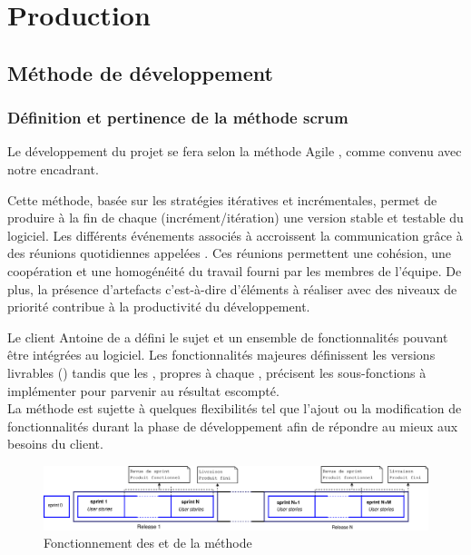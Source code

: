 \chapter{Production}
\section{Méthode de développement}
\subsection{Définition et pertinence de la méthode scrum}
Le développement du projet se fera selon la méthode Agile , comme convenu avec notre encadrant.

Cette méthode, basée sur les stratégies itératives et incrémentales, permet de produire à la fin de chaque  (incrément/itération) une version stable et testable du logiciel. Les différents événements associés à  accroissent la communication grâce à des réunions quotidiennes appelées . Ces réunions permettent une cohésion, une coopération et une homogénéité du travail fourni par les membres de l'équipe. De plus, la présence d'artefacts c'est-à-dire d'éléments à réaliser avec des niveaux de priorité contribue à la productivité du développement.
 
Le client Antoine de  a défini le sujet et un ensemble de fonctionnalités pouvant être intégrées au logiciel. Les fonctionnalités majeures définissent les versions livrables () tandis que les , propres à chaque , précisent les sous-fonctions à implémenter pour parvenir au résultat escompté. \\
La méthode  est sujette à quelques flexibilités tel que l'ajout ou la modification de fonctionnalités durant la phase de développement afin de répondre au mieux aux besoins du client.  

\begin{figure}[H]
	\centering
	\includegraphics[width=18cm]{screens/scrum.eps}
	\caption{Fonctionnement des  et  de la méthode }
\end{figure}

